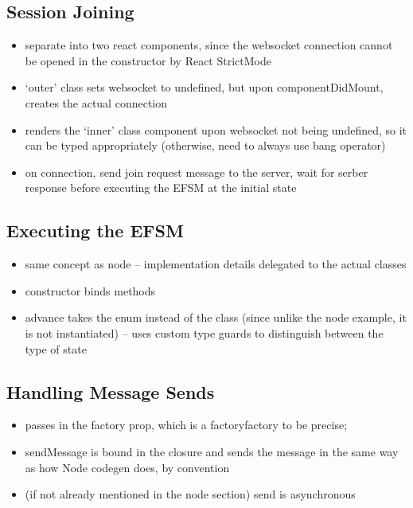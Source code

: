 \subsection{Session Joining}
\begin{itemize}
\item separate into two react components, since the websocket connection cannot be opened in the constructor by React StrictMode
\item `outer' class sets websocket to undefined, but upon componentDidMount, creates the actual connection
\item renders the `inner' class component upon websocket not being undefined, so it can be typed appropriately (otherwise, need to always use bang operator)
\item on connection, send join request message to the server, wait for serber response before executing the EFSM at the initial state
\end{itemize}

\subsection{Executing the EFSM}
\begin{itemize}
\item same concept as node -- implementation details delegated to the actual classes
\item constructor binds methods
\item advance takes the enum instead of the class (since unlike the node example, it is not instantiated) -- uses custom type guards to distinguish between the type of state
\end{itemize}

\subsection{Handling Message Sends}
\begin{itemize}
\item passes in the factory prop, which is a factoryfactory to be precise;
\item sendMessage is bound in the closure and sends the message in the same way as how Node codegen does, by convention
\item (if not already mentioned in the node section) send is asynchronous
\end{itemize}

